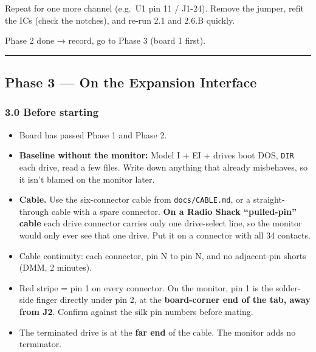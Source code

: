 \documentclass[
  10pt,
]{article}
\providecommand{\tightlist}{%
  \setlength{\itemsep}{0pt}\setlength{\parskip}{0pt}}
\begin{document}
Repeat for one more channel (e.g.~U1 pin 11 / J1-24). Remove
the jumper, refit the ICs (check the notches), and re-run
2.1 and 2.6.B quickly.

Phase 2 done → record, go to Phase 3 (board 1 first).

\begin{center}\rule{0.5\linewidth}{0.5pt}\end{center}

\hypertarget{phase-3-on-the-expansion-interface}{%
\subsection{Phase 3 --- On the Expansion
Interface}\label{phase-3-on-the-expansion-interface}}

\hypertarget{before-starting}{%
\subsubsection{3.0 Before starting}\label{before-starting}}

\begin{itemize}
\tightlist
\item[$\square$]
  Board has passed Phase 1 and Phase 2.
\item[$\square$]
  \textbf{Baseline without the monitor:} Model I + EI +
  drives boot DOS, \texttt{DIR} each drive, read a few
  files. Write down anything that already misbehaves, so it
  isn't blamed on the monitor later.
\item[$\square$]
  \textbf{Cable.} Use the six-connector cable from
  \texttt{docs/CABLE.md}, or a straight-through cable with a
  spare connector. \textbf{On a Radio Shack ``pulled-pin''
  cable} each drive connector carries only one drive-select
  line, so the monitor would only ever see that one drive.
  Put it on a connector with all 34 contacts.
\item[$\square$]
  Cable continuity: each connector, pin N to pin N, and no
  adjacent-pin shorts (DMM, 2 minutes).
\item[$\square$]
  Red stripe = pin 1 on every connector. On the monitor, pin
  1 is the solder-side finger directly under pin 2, at the
  \textbf{board-corner end of the tab, away from J2}.
  Confirm against the silk pin numbers before mating.
\item[$\square$]
  The terminated drive is at the \textbf{far end} of the
  cable. The monitor adds no terminator.
\end{itemize}
\end{document}
